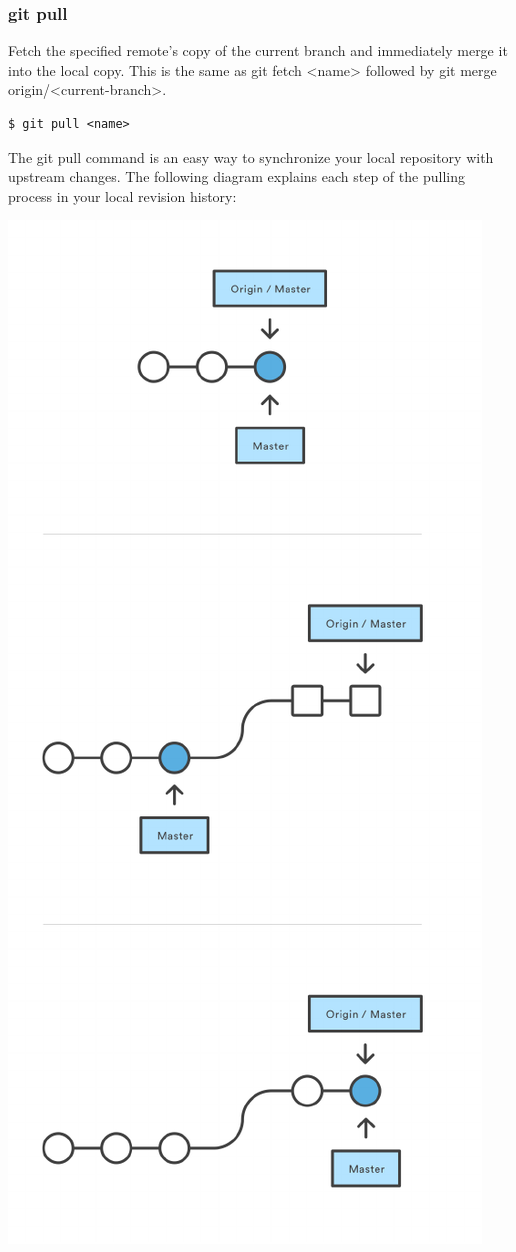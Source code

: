 \documentclass{article}
\begin{document}
\subsubsection*{git pull}

Fetch the specified remote's copy of the current branch and
immediately merge it into the local copy. This is the same as git
fetch <name> followed by git merge origin/<current-branch>.

\begin{lstlisting}
$ git pull <name>
\end{lstlisting}

The git pull command is an easy way to synchronize your local repository with upstream
changes. The following diagram explains each step of the pulling
process in your local revision history: 

\begin{center}
\includegraphics[scale=0.7]{figures/07.pdf}

\end{center}
\end{document}

